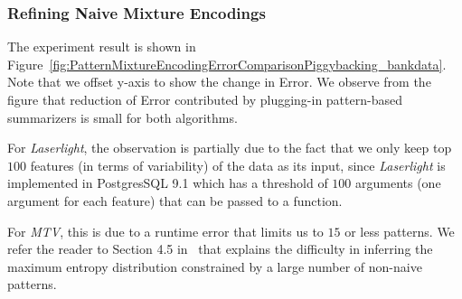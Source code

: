 \subsubsection{Refining Naive Mixture Encodings}
\label{sec:refiningnaivemixtureencodings}
The experiment result is shown in Figure~\ref{fig:PatternMixtureEncodingErrorComparisonPiggybacking_bankdata}.
Note that we offset y-axis to show the change in Error.
We observe from the figure that reduction of Error contributed by plugging-in pattern-based summarizers is small for both algorithms.

For \textit{Laserlight}, the observation is partially due to the fact that we only keep top $100$ features (in terms of variability) of the data as its input, since \textit{Laserlight} is implemented in PostgresSQL 9.1 which has a threshold of $100$ arguments (one argument for each feature) that can be passed to a function.

For \textit{MTV}, this is due to a runtime error that limits us to $15$ or less patterns.
We refer the reader to Section 4.5 in~\cite{DBLP:journals/tkdd/MampaeyVT12} that explains the difficulty in inferring the maximum entropy distribution constrained by a large number of non-naive patterns.



